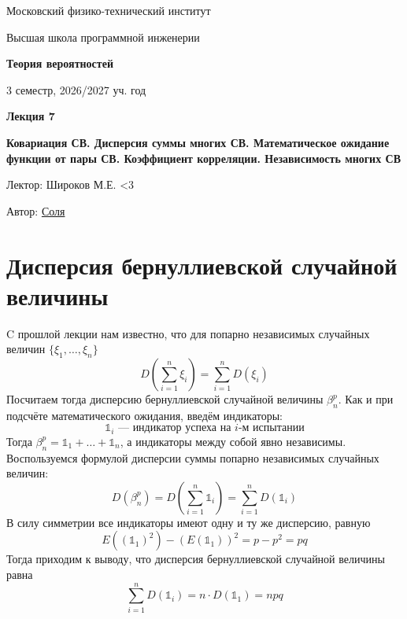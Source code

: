 \documentclass[11pt]{article}
\newcommand{\lectureNumber}{7}
\newcommand{\lectureTitle}{Ковариация СВ. Дисперсия суммы многих СВ. Математическое ожидание функции от пары СВ. Коэффициент корреляции. Независимость многих СВ}
\newcommand{\courseName}{Теория вероятностей}
\newcommand{\semester}{3 семестр, 2026/2027 уч. год}
\begin{document}
\begin{titlepage}
    \centering
    
    {\large Московский физико-технический институт \par}
    {\large Высшая школа программной инженерии \par}
    \vspace{2cm}

    {\Large \textbf{\courseName} \par}
    {\large \semester \par}
    
    \vspace*{\fill}

    {\Huge \textbf{Лекция \lectureNumber} \par}
    {\Huge \textbf{\lectureTitle} \par}
    
    \vspace*{\fill}
    
    {\large Лектор: Широков М.Е. <3\par}
    {\large Автор: \href{t.me/sol_m_07}{Соля} \par}

\end{titlepage}


\section{Дисперсия бернуллиевской случайной величины}

C прошлой лекции нам известно, что для попарно независимых случайных величин $\{\xi_1, \ldots, \xi_n\}$
\[D\left(\sum_{i = 1}^{n} \xi_i\right) = \sum_{i = 1}^{n} D(\xi_i)\]
Посчитаем тогда дисперсию бернуллиевской случайной величины $\beta_n^p$. Как и при подсчёте 
математического ожидания, введём индикаторы:
\[\mathds{1}_i \text{ --- индикатор успеха на } i \text{-м испытании}\]
Тогда $\beta_n^p = \mathds{1}_1 + \ldots + \mathds{1}_n$, а индикаторы между собой явно независимы. 
Воспользуемся формулой дисперсии суммы попарно независимых случайных величин:
\[D(\beta_n^p) = D\left(\sum_{i = 1}^{n} \mathds{1}_i\right) = \sum_{i = 1}^{n} D(\mathds{1}_i)\]
В силу симметрии все индикаторы имеют одну и ту же дисперсию, равную 
\[E((\mathds{1}_1)^2) - (E(\mathds{1}_1))^2 = p - p^2 = pq\]
Тогда приходим к выводу, что дисперсия бернуллиевской случайной величины равна
\[\sum_{i = 1}^{n} D(\mathds{1}_i) = n \cdot D(\mathds{1}_1) = npq\]
\end{document}
